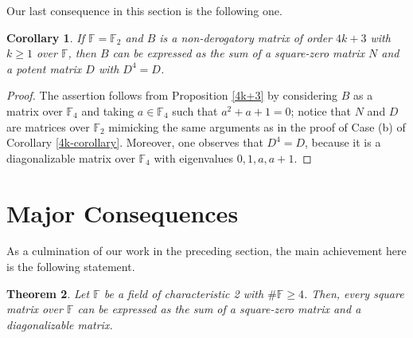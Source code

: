 \documentclass{amsart}
\def\FF{\mathbb{F}}
\newtheorem{theorem}{Theorem}[section]
\newtheorem{corollary}[theorem]{Corollary}
\theoremstyle{definition}
\theoremstyle{remark}
\numberwithin{equation}{section}
\begin{document}
Our last consequence in this section is the following one.

\begin{corollary}\label{4k+3-corollary}
If $\FF=\FF_2$ and $B$ is a non-derogatory matrix of order $4k+3$ with $k\ge 1$ over $\FF$, then $B$ can be expressed as the sum of a square-zero matrix $N$ and a potent matrix $D$ with $D^4=D$.
\end{corollary}

\begin{proof}
The assertion follows from Proposition \ref{4k+3} by considering $B$ as a matrix over $\FF_4$ and taking $a\in \FF_4$ such that $a^2+a+1=0$; notice that $N$ and $D$ are matrices over $\FF_2$ mimicking the same arguments as in the proof of Case (b) of Corollary \ref{4k-corollary}. Moreover, one observes that $D^4=D$, because it is a diagonalizable matrix over $\FF_4$ with eigenvalues $0,1,a,a+1$.
\end{proof}

\section{Major Consequences}

As a culmination of our work in the preceding section, the main achievement here is the following statement.

\begin{theorem}\label{main} Let $\FF$ be a field of characteristic 2 with $\#\FF\ge4$. Then, every square matrix over $\FF$ can be expressed as the sum of a square-zero matrix and a diagonalizable matrix.
\end{theorem}
\end{document}
